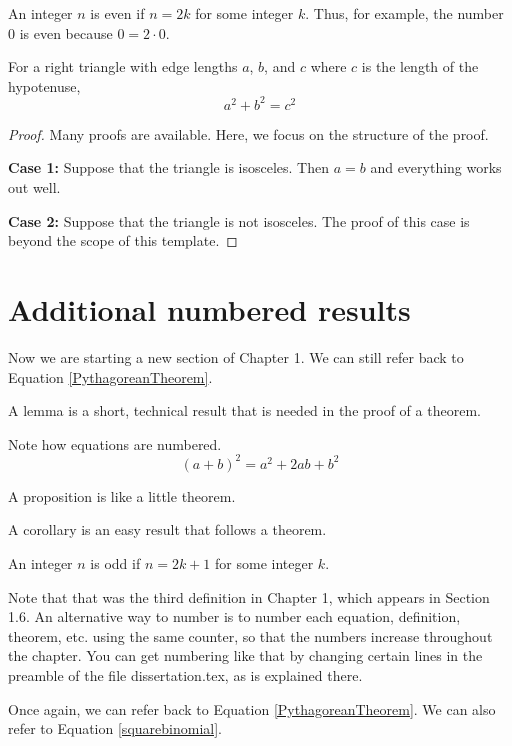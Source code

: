 \begin{definition}
An integer $n$ is even if $n=2k$ for some integer $k$.
Thus, for example, the number $0$ is even because $0=2\cdot 0$.
\end{definition}

\begin{theorem}
For a right triangle with edge lengths $a$, $b$, and $c$ where $c$ is the length of the hypotenuse, 
\begin{equation} \label{PythagoreanTheorem}
    a^2 + b^2 = c^2
\end{equation}
\end{theorem}
\begin{proof}
Many proofs are available.  Here, we focus on the structure of the proof.

\noindent
{\bf Case 1:} Suppose that the triangle is isosceles.
Then $a = b$ and everything works out well.

\noindent
{\bf Case 2:} Suppose that the triangle is not isosceles.
The proof of this case is beyond the scope of this template.
\end{proof}

\section{Additional numbered results}
\label{AdditionalNumberedResults}

Now we are starting a new section of Chapter 1.
We can still refer back to Equation \ref{PythagoreanTheorem}.

\begin{lemma}
A lemma is a short, technical result that is needed in the proof of a theorem.
\end{lemma}

Note how equations are numbered.
\begin{equation} \label{squarebinomial}
    (a+b)^2 = a^2 + 2 ab + b^2
\end{equation}

\begin{proposition}
A proposition is like a little theorem.
\end{proposition}

\begin{corollary}
A corollary is an easy result that follows a theorem.
\end{corollary}

\begin{definition}
An integer $n$ is odd if $n=2k+1$ for some integer $k$.
\end{definition}

Note that that was the third definition in Chapter 1, which appears in Section 1.6.
An alternative way to number is to number each equation, definition, theorem, etc. using the same counter, so that the numbers increase throughout the chapter.
You can get numbering like that by changing certain lines in the preamble of the file dissertation.tex, as is explained there.

Once again, we can refer back to Equation \ref{PythagoreanTheorem}.
We can also refer to Equation \ref{squarebinomial}.

